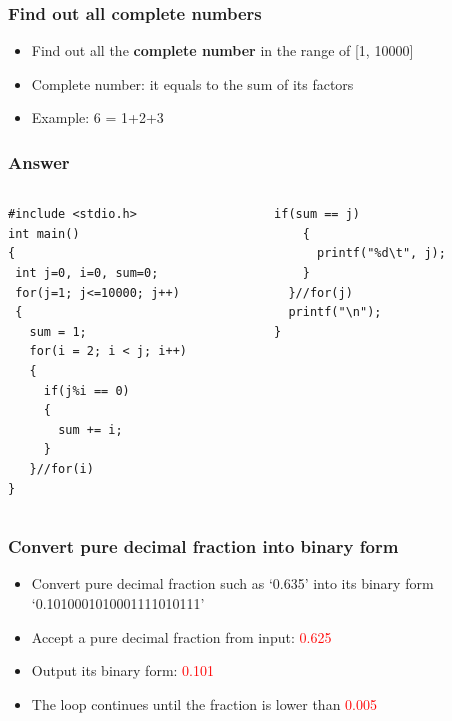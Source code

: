 \begin{frame}
\frametitle{Find out all complete numbers}
\begin{itemize}
	\item {Find out all the \textbf{complete number} in the range of [1, 10000]}
	\item {Complete number: it equals to the sum of its factors }
	\item {Example: 6 = 1+2+3}
\end{itemize}

\end{frame}

\ifx\answer{}
\begin{frame}[fragile]
\frametitle{Answer}
\vspace{-0.15in}
\begin{columns}
\begin{column}{0.53\linewidth}
\begin{lstlisting}[xleftmargin=0.02\linewidth]
#include <stdio.h>
int main()
{
 int j=0, i=0, sum=0;
 for(j=1; j<=10000; j++)
 {
   sum = 1;
   for(i = 2; i < j; i++)
   {
     if(j%i == 0)
     {
       sum += i;
     }
   }//for(i)
}
\end{lstlisting}
\end{column}
\begin{column}{0.47\linewidth}
\begin{lstlisting}[firstnumber=16]
    if(sum == j)
    {
      printf("%d\t", j);
    }
  }//for(j)
  printf("\n");
}
\end{lstlisting}
\end{column}
\end{columns}

\end{frame}
\fi


\begin{frame}
\frametitle{Convert pure decimal fraction into binary form}
\begin{itemize}
	\item {Convert pure decimal fraction such as `0.635' into its binary form `0.1010001010001111010111'}
	\item {Accept a  pure decimal fraction from input: \textcolor{red}{0.625}}
	\item {Output its binary form: \textcolor{red}{0.101}}
	\item {The loop continues until the fraction is lower than \textcolor{red}{0.005}}
\end{itemize}

\end{frame}


